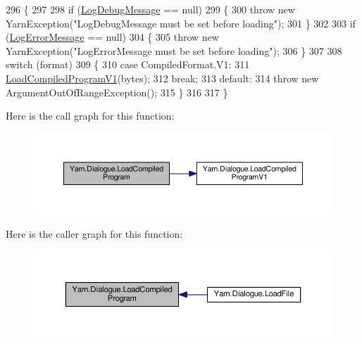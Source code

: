 \begin{DoxyCode}
296         \{
297 
298             \textcolor{keywordflow}{if} (\hyperlink{a00092_a381f48bb0fbb294f8cf44ca57f11be31}{LogDebugMessage} == null)
299             \{
300                 \textcolor{keywordflow}{throw} \textcolor{keyword}{new} YarnException(\textcolor{stringliteral}{"LogDebugMessage must be set before loading"});
301             \}
302 
303             \textcolor{keywordflow}{if} (\hyperlink{a00092_a9801e83dd044d6498fdf6ebcc6bec5ac}{LogErrorMessage} == null)
304             \{
305                 \textcolor{keywordflow}{throw} \textcolor{keyword}{new} YarnException(\textcolor{stringliteral}{"LogErrorMessage must be set before loading"});
306             \}
307 
308             \textcolor{keywordflow}{switch} (format)
309             \{
310                 \textcolor{keywordflow}{case} CompiledFormat.V1:
311                     \hyperlink{a00092_a706df08e842c2419f7a66fd40c0a544f}{LoadCompiledProgramV1}(bytes);
312                     \textcolor{keywordflow}{break};
313                 \textcolor{keywordflow}{default}:
314                     \textcolor{keywordflow}{throw} \textcolor{keyword}{new} ArgumentOutOfRangeException();
315             \}
316 
317         \}
\end{DoxyCode}


Here is the call graph for this function\-:
\nopagebreak
\begin{figure}[H]
\begin{center}
\leavevmode
\includegraphics[width=350pt]{a00092_a4bc1ceca26754dc3ec0a2281dfee26ce_cgraph}
\end{center}
\end{figure}




Here is the caller graph for this function\-:
\nopagebreak
\begin{figure}[H]
\begin{center}
\leavevmode
\includegraphics[width=350pt]{a00092_a4bc1ceca26754dc3ec0a2281dfee26ce_icgraph}
\end{center}
\end{figure}


